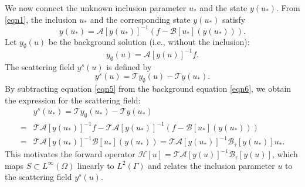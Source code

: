 \documentclass[onefignum,onetabnum]{siamart190516}
\numberwithin{equation}{section}
\begin{document}
We now connect the unknown inclusion parameter $u_*$ and the state $y(u_*)$.
From \eqref{eqn1}, the inclusion $u_{*}$ and the corresponding state $y(u_{*})$ satisfy
\begin{equation}\label{eqn5}
y(u_{*}) = \mathcal{A}[y(u_{*})]^{-1}\left(f - \mathcal{B}[u_{*}](y(u_{*}))\right).
\end{equation}
Let $y_{\emptyset}(u)$ be the background solution (i.e., without the inclusion):
\begin{equation}\label{eqn6}
y_{\emptyset}(u) = \mathcal{A}[y(u)]^{-1}f.
\end{equation}
The scattering field $y^s(u)$ is defined by
\begin{equation*}
y^{s}(u) = \mathcal{T}y_{\emptyset}(u) - \mathcal{T}y(u_{*}).
\end{equation*}
By subtracting equation \eqref{eqn5} from the background equation \eqref{eqn6}, we obtain the expression for the scattering field:
\begin{align}
&y^{s}(u_{*}) = \mathcal{T}y_{\emptyset}(u_{*}) - \mathcal{T}y(u_{*}) \nonumber\\
=& \mathcal{T}\mathcal{A}[y(u_{*})]^{-1}f - \mathcal{T}\mathcal{A}[y(u_{*})]^{-1}\left(f - \mathcal{B}[u_{*}](y(u_{*}))\right)\nonumber \\
=& \mathcal{T}\mathcal{A}[y(u_{*})]^{-1}\mathcal{B}[u_{*}](y(u_{*})) = \mathcal{T}\mathcal{A}[y(u_{*})]^{-1}\mathcal{B}_{\tau}[y(u_{*})]u_{*}.\label{eqn8}
\end{align}
This motivates the forward operator $\mathcal{H}[u] = \mathcal{T}\mathcal{A}[y(u)]^{-1}\mathcal{B}_{\tau}[y(u)]$, which maps $S\subset L^{\infty}(\Omega)$ linearly to $L^{2}(\Gamma)$ and relates the inclusion parameter $u$ to the scattering field $y^{s}(u)$.
\end{document}

